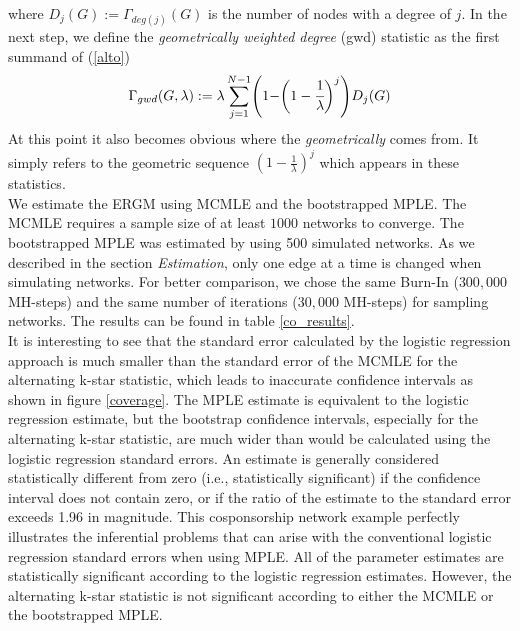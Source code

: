 \documentclass[10pt, conference, compsocconf]{IEEEtran}
\begin{document}
where $D_j(G):= \Gamma_{deg(j)}(G)$ is the number of nodes with a degree of $j$. 
In the next step, we define the \textit{geometrically weighted degree} (gwd) statistic as the first summand of (\ref{alto})
\begin{equation}
\Gamma_{gwd}(G,\lambda):= \lambda\sum_{j=1}^{N-1}\Biggr(1- \biggr(1-\cfrac{1}{\lambda}\biggl)^j\Biggl)D_j(G)
\end{equation}
At this point it also becomes obvious where the \textit{geometrically} comes from. It simply refers to the geometric sequence $(1-\frac{1}{\lambda})^j$ which appears in these statistics.\\
\indent We estimate the ERGM using MCMLE and the bootstrapped MPLE. The MCMLE requires a sample size of at least $1000$ networks to converge. The bootstrapped MPLE was estimated by using 500 simulated networks. As we described in the section {\it Estimation}, only one edge at a time is changed when simulating networks. For better comparison, we chose the same Burn-In ($300,000$ MH-steps) and the same number of iterations ($30,000$ MH-steps) for sampling networks. The results can be found in table \ref{co_results}.\\
\indent It is interesting to see that the standard error calculated by the logistic regression approach is much smaller than the standard error of the MCMLE for the alternating k-star statistic, which leads to inaccurate confidence intervals as shown in figure \ref{coverage}. The MPLE estimate is equivalent to the logistic regression estimate, but the bootstrap confidence intervals, especially for the alternating k-star statistic, are much wider than would be calculated using the logistic regression standard errors. An estimate is generally considered statistically different from zero (i.e., statistically significant) if the confidence interval does not contain zero, or if the ratio of the estimate to the standard error exceeds 1.96 in magnitude. This cosponsorship network example perfectly illustrates the inferential problems that can arise with the conventional logistic regression standard errors when using MPLE. All of the parameter estimates are statistically significant according to the logistic regression estimates. However, the alternating k-star statistic is not significant according to either the MCMLE or the bootstrapped MPLE.
\end{document}
